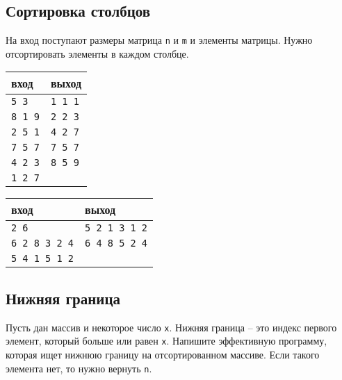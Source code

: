 \documentclass[10pt]{article}
\begin{document}
\subsection{Сортировка столбцов}
На вход поступают размеры матрица \texttt{n} и \texttt{m} и элементы матрицы. Нужно отсортировать элементы в каждом столбце.
\begin{multicols}{2}
\begin{center}
\begin{tabular}{ l | l }
 вход & выход \\ \hline
 \texttt{5 3} &    \texttt{1 1 1} \\ 
 \texttt{8 1 9} &  \texttt{2 2 3}\\
 \texttt{2 5 1} &  \texttt{4 2 7}\\ 
 \texttt{7 5 7} &  \texttt{7 5 7}\\ 
 \texttt{4 2 3} &  \texttt{8 5 9}\\ 
 \texttt{1 2 7} &  \\ 
\end{tabular}
\end{center}

\begin{center}
\begin{tabular}{ l | l }
 вход & выход \\ \hline
 \texttt{2 6} &          \texttt{5 2 1 3 1 2} \\ 
 \texttt{6 2 8 3 2 4} &  \texttt{6 4 8 5 2 4}\\
 \texttt{5 4 1 5 1 2} & \\ 
\end{tabular}
\end{center}
\end{multicols}



\subsection{Нижняя граница}
Пусть дан массив и некоторое число \texttt{x}. Нижняя граница -- это индекс первого элемент, который больше или равен \texttt{x}. Напишите эффективную программу, которая ищет нижнюю границу на отсортированном массиве. Если такого элемента нет, то нужно вернуть \texttt{n}.
\end{document}
